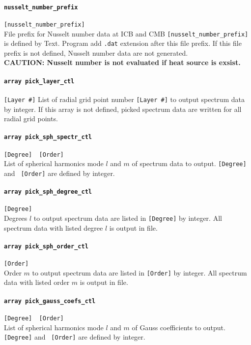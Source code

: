\paragraph{\tt nusselt\_number\_prefix}
\label{href_t:gauss_coefs_prefix}
\verb|[nusselt_number_prefix]| \\
File prefix for Nusselt number data at ICB and CMB \verb|[nusselt_number_prefix]| is defined by Text. Program add {\tt .dat} extension after this file prefix. If this file prefix is not defined, Nusselt number data are not generated. \\
{\bf CAUTION: Nusselt number is not evaluated if heat source is exsist.}

\paragraph{\tt array pick\_layer\_ctl}
\label{href_t:pick_layer_ctl}
\verb|[Layer #]|
List of radial grid point number \verb|[Layer #]| to output spectrum data by integer. If this array is not defined, picked spectrum data are written for all radial grid points.

\paragraph{\tt array pick\_sph\_spectr\_ctl}
\label{href_t:pick_sph_spectr_ctl}
\verb|[Degree]  [Order]| \\
List of spherical harmonics mode $l$ and $m$ of spectrum data to output. \verb|[Degree]| and \verb| [Order]| are defined by integer.

\paragraph{\tt array pick\_sph\_degree\_ctl}
\label{href_t:pick_sph_degree_ctl}
\verb|[Degree]| \\
Degrees $l$ to output spectrum data are listed in \verb|[Degree]| by integer. All spectrum data with listed degree $l$ is output in file.

\paragraph{\tt array pick\_sph\_order\_ctl}
\label{href_t:pick_sph_order_ctl}
\verb|[Order]| \\
Order $m$ to output spectrum data are listed in \verb|[Order]| by integer. All spectrum data with listed order $m$ is output in file.

\paragraph{\tt array pick\_gauss\_coefs\_ctl}
\label{href_t:pick_gauss_coefs_ctl}
\verb|[Degree]  [Order]| \\
List of spherical harmonics mode $l$ and $m$ of Gauss coefficients to output. \verb|[Degree]| and \verb| [Order]| are defined by integer.

